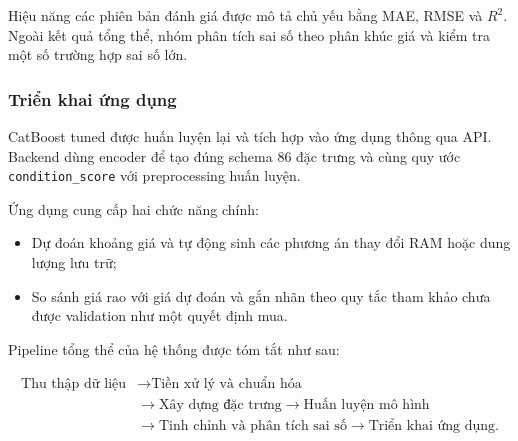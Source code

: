 Hiệu năng các phiên bản đánh giá được mô tả chủ yếu bằng MAE, RMSE và $R^2$. Ngoài kết quả tổng thể, nhóm phân tích sai số theo phân khúc giá và kiểm tra một số trường hợp sai số lớn.

\subsubsection{Triển khai ứng dụng}

CatBoost tuned được huấn luyện lại và tích hợp vào ứng dụng thông qua API. Backend dùng encoder để tạo đúng schema 86 đặc trưng và cùng quy ước \texttt{condition\_score} với preprocessing huấn luyện.

Ứng dụng cung cấp hai chức năng chính:

\begin{itemize}
    \item Dự đoán khoảng giá và tự động sinh các phương án thay đổi RAM hoặc dung lượng lưu trữ;
    \item So sánh giá rao với giá dự đoán và gắn nhãn theo quy tắc tham khảo chưa được validation như một quyết định mua.
\end{itemize}

Pipeline tổng thể của hệ thống được tóm tắt như sau:

\begin{equation}
\begin{split}
    \text{Thu thập dữ liệu}
    &\rightarrow
    \text{Tiền xử lý và chuẩn hóa} \\
    &\rightarrow
    \text{Xây dựng đặc trưng}
    \rightarrow
    \text{Huấn luyện mô hình} \\
    &\rightarrow
    \text{Tinh chỉnh và phân tích sai số}
    \rightarrow
    \text{Triển khai ứng dụng}.
\end{split}
\end{equation}
